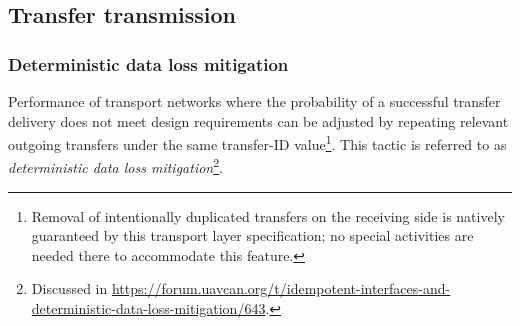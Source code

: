 \subsection{Transfer transmission}

\subsubsection{Deterministic data loss mitigation}\label{sec:transport_deterministic_data_loss_mitigation}

Performance of transport networks where the probability of a successful transfer delivery
does not meet design requirements can be adjusted by repeating relevant outgoing transfers
under the same transfer-ID value\footnote{%
    Removal of intentionally duplicated transfers on the receiving side is natively guaranteed
    by this transport layer specification;
    no special activities are needed there to accommodate this feature.
}.
This tactic is referred to as \emph{deterministic data loss mitigation}\footnote{%
    Discussed in
    \url{https://forum.uavcan.org/t/idempotent-interfaces-and-deterministic-data-loss-mitigation/643}.
}.

